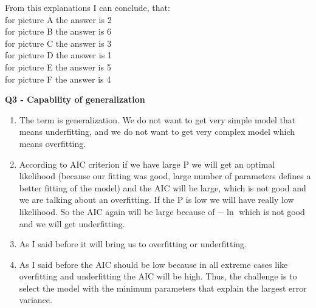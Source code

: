 \documentclass[12pt,a4paper]{article}
\begin{document}
From this explanations I can conclude, that:\\
for picture A the answer is 2\\
for picture B the answer is 6\\
for picture C the answer is 3\\
for picture D the answer is 1\\
for picture E the answer is 5\\
for picture F the answer is 4\\
\newpage
\begin{center}
	\textbf{Q3 - Capability of generalization}
\end{center}
\begin{enumerate}[label=(\alph*)]
\item The term is generalization. We do not want to get very simple model that means underfitting, and we do not want to get very complex model which means overfitting. 
\item According to AIC criterion if we have large P we will get an optimal likelihood (because our fitting was good, large number of parameters defines a better fitting of the model) and the AIC will be large, which is not good and we are talking about an overfitting. If the P is low we will have really low likelihood. So the AIC again will be large because of $-\ln$ which is not good and we will get underfitting.
\item As I said before it will bring us to overfitting or underfitting.
\item As I said before the AIC should be low because in all extreme cases like overfitting and underfitting the AIC will be high. Thus, the challenge is to select the model with the minimum parameters that explain the largest error variance\cite{AIC}.

\end{enumerate}
\newpage


\end{document}
